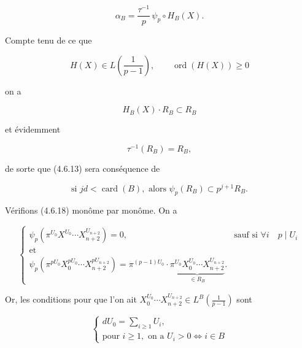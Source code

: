 \begin{equation}\tag{4.6.14}
\alpha_B=\frac{\tau^{-1}}p\,\psi_p\circ H_B(X).
\end{equation}

Compte tenu de ce que

\begin{equation}\tag{4.6.15}
H(X)\in L\!\left(\frac1{p-1}\right),
\qquad \operatorname{ord}(H(X))\geq0
\end{equation}

on a

\begin{equation}\tag{4.6.16}
H_B(X)\cdot R_B\subset R_B
\end{equation}

et évidemment

\begin{equation}\tag{4.6.17}
\tau^{-1}(R_B)=R_B,
\end{equation}


de sorte que (4.6.13) sera conséquence de

\begin{equation}\tag{4.6.18}
\text{si }jd<\operatorname{card}(B),\text{ alors }
\psi_p(R_B)\subset p^{j+1}R_B.
\end{equation}

Vérifions (4.6.18) monôme par monôme. On a

\begin{equation}\tag{4.6.19}
\begin{cases}
\psi_p\!\left(\pi^{U_0}X^{U_0}\cdots X_{n+2}^{U_{n+2}}\right)=0,
&\text{sauf si }\forall i\quad p\mid U_i\\
\text{et}\\[3pt]
\psi_p\!\left(
\pi^{pU_0}X_0^{pU_0}\cdots X_{n+2}^{pU_{n+2}}
\right)
=\pi^{(p-1)U_0}\cdot
\underbrace{\pi^{U_0}X_0^{U_0}\cdots X_{n+2}^{U_{n+2}}}_{\in R_B}.
\end{cases}
\end{equation}

Or, les conditions pour que l'on ait
$X_0^{U_0}\cdots X_{n+2}^{U_{n+2}}
\in L^B\!\left(\frac1{p-1}\right)$ sont

\begin{equation}\tag{4.6.20}
\begin{cases}
dU_0=\displaystyle\sum_{i\geq1}U_i,\\
\text{pour }i\geq1,\text{ on a }U_i>0\Longleftrightarrow i\in B
\end{cases}
\end{equation}

